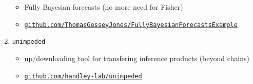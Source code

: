 \documentclass[aspectratio=169]{beamer}
\begin{document}
\begin{frame}
\begin{enumerate}
\begin{itemize}
                \item Fully Bayesian forecasts (no more need for Fisher)
                \item \texttt{\href{https://github.com/ThomasGesseyJones/FullyBayesianForecastsExample}{github.com/ThomasGesseyJones/FullyBayesianForecastsExample}} 
            \end{itemize}
        \item \texttt{unimpeded}
            \begin{itemize}
                \item up/downloading tool for transfering inference products (beyond chains)
                \item \texttt{\href{https://github.com/handley-lab/unimpeded}{github.com/handley-lab/unimpeded}} 
            \end{itemize}
    \end{enumerate}
\end{frame}
 
\end{document}
